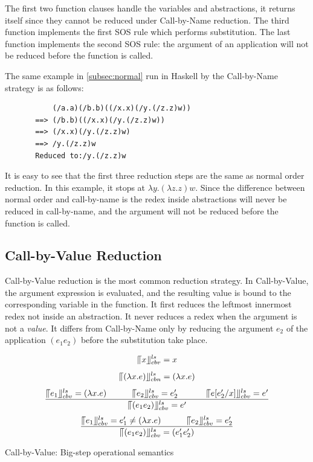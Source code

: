 The first two function clauses handle the variables and abstractions, it returns itself since they cannot be reduced under Call-by-Name reduction. The third function implements the first SOS rule which performs substitution. The last function implements the second SOS rule: the argument of an application will not be reduced before the function is called. 

\begin{exmp}
\normalfont The same example in \ref{subsec:normal} run in Haskell by the Call-by-Name strategy is as follows:
\end{exmp}


\begin{verbatim}
           (/a.a)(/b.b)((/x.x)(/y.(/z.z)w))
       ==> (/b.b)((/x.x)(/y.(/z.z)w))
       ==> (/x.x)(/y.(/z.z)w)
       ==> /y.(/z.z)w
       Reduced to:/y.(/z.z)w
\end{verbatim}

It is easy to see that the first three reduction steps are the same as normal order reduction. In this example, it stops at $\lambda y.(\lambda z.z)w$. Since the difference between normal order and call-by-name is the redex inside abstractions will never be reduced in call-by-name, and the argument will not be reduced before the function is called. 


\subsection{Call-by-Value Reduction}{\label{subsec:cbv}}

Call-by-Value reduction is the most common reduction strategy. In Call-by-Value, the argument expression is evaluated, and the resulting value is bound to the corresponding variable in the function. It first reduces the leftmost innermost redex not inside an abstraction. It never reduces a redex when the argument is not a \textit{value}. It differs from Call-by-Name only by reducing the argument $e_2$ of the application $(e_1e_2)$ before the substitution take place. 


\begin{equation*}
\llceil x \rrfloor ^{ls} _{cbv} = x
\end{equation*}
\begin{equation*}
\llceil (\lambda x.e) \rrfloor ^{ls} _{cbn} = (\lambda x.e)
\end{equation*}
\begin{equation*}
\frac{\llceil e_1 \rrfloor ^{ls} _{cbv} = (\lambda x.e)\ \ \ \ \ \ \ \ \ \llceil e_2 \rrfloor ^{ls} _{cbv} = e'_2\ \ \ \ \ \ \ \ \ \ \llceil e[e'_2/x] \rrfloor ^{ls} _{cbv}  = e'}{\llceil (e_1e_2) \rrfloor ^{ls} _{cbv} = e'}
\end{equation*}
\begin{equation*}
\frac{\llceil e_1 \rrfloor ^{ls} _{cbv} = e'_1\neq (\lambda x.e)\ \ \ \ \ \ \ \ \ \llceil e_2 \rrfloor ^{ls} _{cbv} = e'_2}{\llceil (e_1e_2) \rrfloor ^{ls} _{cbv} = (e'_1e'_2)}
\end{equation*}
\begin{center}
Call-by-Value: Big-step operational semantics
\end{center}

